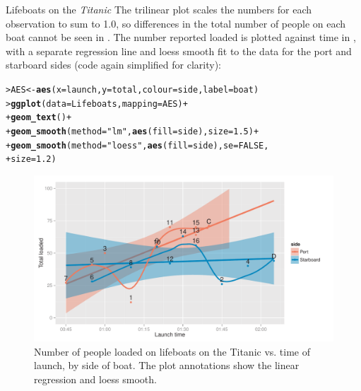 \documentclass[10pt,krantz2]{krantz}\usepackage[]{graphicx}\usepackage[]{color}
\makeatletter
\newcommand{\hlnum}[1]{\textcolor[rgb]{0.686,0.059,0.569}{#1}}%
\newcommand{\hlstr}[1]{\textcolor[rgb]{0.192,0.494,0.8}{#1}}%
\newcommand{\hlopt}[1]{\textcolor[rgb]{0,0,0}{#1}}%
\newcommand{\hlstd}[1]{\textcolor[rgb]{0.345,0.345,0.345}{#1}}%
\newcommand{\hlkwb}[1]{\textcolor[rgb]{0.69,0.353,0.396}{#1}}%
\newcommand{\hlkwc}[1]{\textcolor[rgb]{0.333,0.667,0.333}{#1}}%
\newcommand{\hlkwd}[1]{\textcolor[rgb]{0.737,0.353,0.396}{\textbf{#1}}}%
\newenvironment{kframe}{%
 \def\at@end@of@kframe{}%
 \ifinner\ifhmode%
  \def\at@end@of@kframe{\end{minipage}}%
  \begin{minipage}{\columnwidth}%
 \fi\fi%
 \def\FrameCommand##1{\hskip\@totalleftmargin \hskip-\fboxsep
 \colorbox{shadecolor}{##1}\hskip-\fboxsep
     \hskip-\linewidth \hskip-\@totalleftmargin \hskip\columnwidth}%
 \MakeFramed {\advance\hsize-\width
   \@totalleftmargin\z@ \linewidth\hsize
   \@setminipage}}%
 {\par\unskip\endMakeFramed%
 \at@end@of@kframe}
\newenvironment{knitrout}{}{} %
\renewenvironment{knitrout}{\small\renewcommand{\baselinestretch}{.85}}{} %
\makeatother
\begin{document}
\begin{Example}[lifeboat1]{Lifeboats on the \emph{Titanic}}
The trilinear plot scales the numbers for each observation to sum
to 1.0, so differences in the total number of people on each boat
cannot be seen in .
The  number reported loaded is plotted against
 time in ,
with a separate regression line and loess smooth
fit to the data for the port and starboard
sides (code again simplified for clarity):
\begin{knitrout}
\color{fgcolor}\begin{kframe}
\begin{alltt}
\hlstd{> }\hlstd{AES} \hlkwb{<-} \hlkwd{aes}\hlstd{(}\hlkwc{x} \hlstd{= launch,} \hlkwc{y} \hlstd{= total,} \hlkwc{colour} \hlstd{= side,} \hlkwc{label} \hlstd{= boat)}
\hlstd{> }\hlkwd{ggplot}\hlstd{(}\hlkwc{data} \hlstd{= Lifeboats,} \hlkwc{mapping} \hlstd{= AES)} \hlopt{+}
\hlstd{+ }     \hlkwd{geom_text}\hlstd{()} \hlopt{+}
\hlstd{+ }     \hlkwd{geom_smooth}\hlstd{(}\hlkwc{method} \hlstd{=} \hlstr{"lm"}\hlstd{,} \hlkwd{aes}\hlstd{(}\hlkwc{fill} \hlstd{= side),} \hlkwc{size} \hlstd{=} \hlnum{1.5}\hlstd{)} \hlopt{+}
\hlstd{+ }     \hlkwd{geom_smooth}\hlstd{(}\hlkwc{method} \hlstd{=} \hlstr{"loess"}\hlstd{,} \hlkwd{aes}\hlstd{(}\hlkwc{fill} \hlstd{= side),} \hlkwc{se} \hlstd{=} \hlnum{FALSE}\hlstd{,}
\hlstd{+ }                 \hlkwc{size} \hlstd{=} \hlnum{1.2}\hlstd{)}
\end{alltt}
\end{kframe}
\end{knitrout}
\begin{knitrout}
\color{fgcolor}\begin{figure}[!htbp]

\centerline{\includegraphics[width=.8\textwidth]{ch04/fig/lifeboats2-1} }

\caption[Number of people loaded on lifeboats on the Titanic vs]{Number of people loaded on lifeboats on the Titanic vs. time of launch, by side of boat. The plot annotations show the linear regression and loess smooth.}\label{fig:lifeboats2}
\end{figure}



\end{knitrout}
\end{Example}
\end{document}
